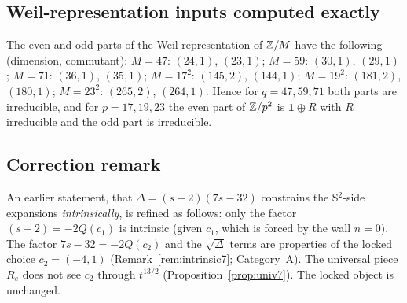 \subsection{Weil-representation inputs computed exactly}\label{sec:rev7weil}
\begin{proposition}[\src{37}, \S3]\label{prop:weil7}
The even and odd parts of the Weil representation of $\mathbb{Z}/M$ have the following (dimension, commutant): $M=47$: $(24,1)$, $(23,1)$; $M=59$: $(30,1)$, $(29,1)$; $M=71$: $(36,1)$, $(35,1)$; $M=17^2$: $(145,2)$, $(144,1)$; $M=19^2$: $(181,2)$, $(180,1)$; $M=23^2$: $(265,2)$, $(264,1)$. Hence for $q=47,59,71$ both parts are irreducible, and for $p=17,19,23$ the even part of $\mathbb{Z}/p^2$ is $\mathbf1\oplus R$ with $R$ irreducible and the odd part is irreducible.
\end{proposition}

\subsection{Correction remark}\label{sec:rev7corr}
\begin{remark}\label{rem:corr7}
An earlier statement, that $\Delta=(s-2)(7s-32)$ constrains the S$^2$-side expansions \emph{intrinsically}, is refined as follows: only the factor $(s-2)=-2Q(c_1)$ is intrinsic (given $c_1$, which is forced by the wall $n=0$). The factor $7s-32=-2Q(c_2)$ and the $\sqrt\Delta$ terms are properties of the locked choice $c_2=(-4,1)$ (Remark~\ref{rem:intrinsic7}; Category~A). The universal piece $R_e$ does not see $c_2$ through $t^{13/2}$ (Proposition~\ref{prop:univ7}). The locked object is unchanged.
\end{remark}

